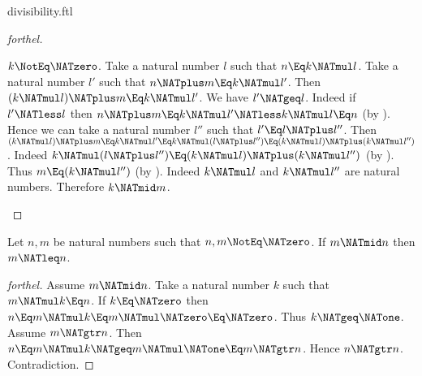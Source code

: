 \documentclass{stex}
\begin{document}
\begin{smodule}{divisibility.ftl}
\begin{proof}[forthel]
  \begin{case}{$k \NotEq \NATzero$.}
    Take a natural number $l$ such that $n \Eq k \NATmul l$.
    Take a natural number $l'$ such that $n \NATplus m \Eq k \NATmul l'$.
    Then $(k \NATmul l) \NATplus m \Eq k \NATmul l'$.
    We have $l' \NATgeq l$.
    Indeed if $l' \NATless l$ then
    $n \NATplus m
      \Eq k \NATmul l'
      \NATless k \NATmul l
      \Eq n$ (by ).
    Hence we can take a natural number $l''$ such that $l' \Eq l \NATplus l''$.
    Then $(k \NATmul l) \NATplus m
      \Eq k \NATmul l'
      \Eq k \NATmul (l \NATplus l'')
      \Eq (k \NATmul l) \NATplus (k \NATmul l'')$.
    Indeed $k \NATmul (l \NATplus l'') \Eq (k \NATmul l) \NATplus (k \NATmul l'')$ (by ).
    Thus $m \Eq (k \NATmul l'')$ (by ).
    Indeed $k \NATmul l$ and $k \NATmul l''$ are natural numbers.
    Therefore $k \NATmid m$.
  \end{case}
\end{proof}

\begin{proposition}[forthel]
  Let $n, m$ be natural numbers such that $n, m \NotEq \NATzero$.
  If $m \NATmid n$ then $m \NATleq n$.
\end{proposition}
\begin{proof}[forthel]
  Assume $m \NATmid n$.
  Take a natural number $k$ such that $m \NATmul k \Eq n$.
  If $k \Eq \NATzero$ then
  $n
    \Eq m \NATmul k
    \Eq m \NATmul \NATzero
    \Eq \NATzero$.
  Thus $k \NATgeq \NATone$.
  Assume $m \NATgtr n$.
  Then $n
    \Eq m \NATmul k
    \NATgeq m \NATmul \NATone
    \Eq m
    \NATgtr n$.
  Hence $n \NATgtr n$.
  Contradiction.
\end{proof}
\end{smodule}
\end{document}
